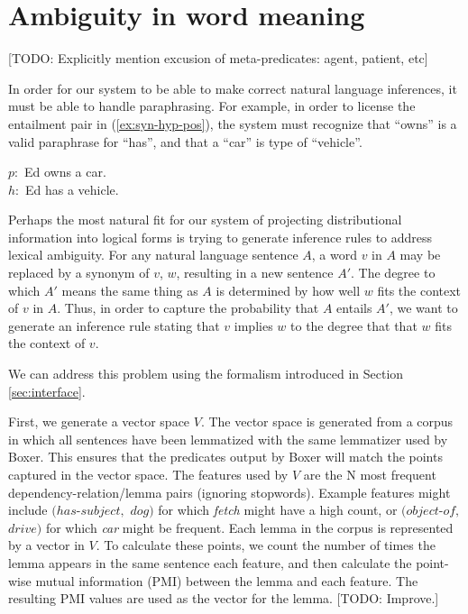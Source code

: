 \section{Ambiguity in word meaning}

[TODO: Explicitly mention excusion of meta-predicates: agent, patient, etc]

In order for our system to be able to make correct natural language inferences,
it must be able to handle paraphrasing.  For example, in order to license the
entailment pair in (\ref{ex:syn-hyp-pos}), the system must recognize that
``owns'' is a valid paraphrase for ``has'', and that a ``car'' is type of
``vehicle''.

\begin{example}\label{ex:syn-hyp-pos}
$p:$ Ed owns a car. \\
$h:$ Ed has a vehicle.
\end{example}

Perhaps the most natural fit for our system of projecting distributional
information into logical forms is trying to generate inference rules to address
lexical ambiguity.  For any natural language sentence $A$, a word $v$ in $A$ may
be replaced by a synonym of $v$, $w$, resulting in a new sentence $A'$.  The
degree to which $A'$ means the same thing as $A$ is determined by how well $w$
fits the context of $v$ in $A$.  Thus, in order to capture the probability that
$A$ entails $A'$, we want to generate an inference rule stating that $v$ implies
$w$ to the degree that that $w$ fits the context of $v$.

We can address this problem using the formalism introduced in
Section \ref{sec:interface}.

First, we generate a vector space $V$.  The vector space is generated from a
corpus in which all sentences have been lemmatized with the same lemmatizer used
by Boxer.  This ensures that the predicates output by Boxer will match the
points captured in the vector space.  The features used by $V$ are the N most
frequent dependency-relation/lemma pairs (ignoring stopwords).  Example features
might include $(has\text{-}subject,$ $dog)$ for which {\it fetch} might have a
high count, or $(object\text{-}of,$ $drive)$ for which {\it car} might be
frequent.  Each lemma in the corpus is represented by a vector in $V$.  To calculate these points, we
count the number of times the lemma appears in the same sentence each feature,
and then calculate the point-wise mutual information (PMI) between the lemma and
each feature.  The resulting PMI values are used as the vector for the lemma.
[TODO: Improve.]


